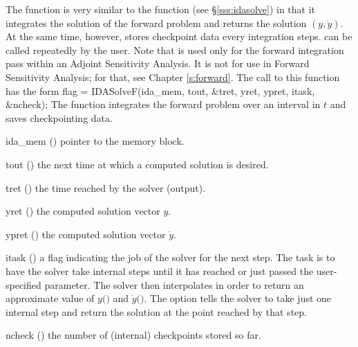The function  is very similar to the {\idas} function 
(see \S\ref{sss:idasolve}) in that it integrates the solution of the forward
problem and returns the solution $(y,\dot{y})$. At the same time, however, 
 stores checkpoint data every  integration steps.
 can be called repeatedly by the user.
Note that  is used only for the forward integration pass within
an Adjoint Sensitivity Analysis.  It is not for use in Forward Sensitivity
Analysis; for that, see Chapter \ref{s:forward}.
The call to this function has the form
{
  flag = IDASolveF(ida\_mem, tout, \&tret, yret, ypret, itask, \&ncheck);
}
{
  The function  integrates the forward problem over an interval in $t$
  and saves checkpointing data.
}
{
  \begin{args}
  \item[ida\_mem] ()
    pointer to the {\idas} memory block.
  \item[tout] ()
    the next time at which a computed solution is desired.
  \item[tret] ()
    the time reached by the solver (output).
  \item[yret] ()
    the computed solution vector $y$.
  \item[ypret] ()
    the computed solution vector $\dot{y}$.
  \item[itask] ()
    a flag indicating the job of the solver for the next step. 
    The  task is to have the solver take internal steps until   
    it has reached or just passed the user-specified 
    parameter. The solver then interpolates in order to   
    return an approximate value of $y($$)$ and $\dot{y}($$)$. 
    The  option tells the solver to take just one internal step  
    and return the solution at the point reached by that step. 
  \item[ncheck] ()
    the number of (internal) checkpoints stored so far.
  \end{args}
}

